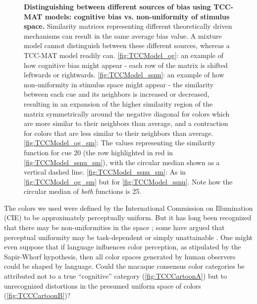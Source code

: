 \begin{figure}
        \caption{\textbf{Distinguishing between different sources of bias using TCC-MAT models: cognitive bias vs. non-uniformity of stimulus space.} Similarity matrices representing different theoretically driven mechanisms can result in the same average bias value. A mixture model cannot distinguish between these different sources, whereas a TCC-MAT model readily can. \ref{fig:TCCModel_og}: an example of how cognitive bias might appear - each row of the matrix is shifted leftwards or rightwards. \ref{fig:TCCModel_ssnu}: an example of how non-uniformity in stimulus space might appear - the similarity between each cue and its neighbors is increased or decreased, resulting in an expansion of the higher similarity region of the matrix symmetrically around the negative diagonal for colors which are more similar to their neighbors than average, and a contraction for colors that are less similar to their neighbors than average. \ref{fig:TCCModel_og_sm}: The values representing the similarity function for cue 20 (the row highlighted in red in \ref{fig:TCCModel_ssnu_sm}), with the circular median shown as a vertical dashed line. \ref{fig:TCCModel_ssnu_sm}: As in \ref{fig:TCCModel_og_sm} but for \ref{fig:TCCModel_ssnu}. Note how the circular median of \emph{both} functions is 25.}
        \label{fig:TCCDemo}
\end{figure}


The colors we used were defined by the International Commission on Illumination (CIE) to be approximately perceptually uniform. 
But it has long been recognized that there may be non-uniformities in the space%
; some have argued that perceptual uniformity may be task-dependent or simply unattainable%
. 
One might even suppose that if language influences color perception, as stipulated by the Sapir-Whorf hypothesis, then all color spaces generated by human observers could be shaped by language. 
Could the macaque consensus color categories be attributed not to a true “cognitive” category (\autoref{fig:TCCCartoonA}) but to unrecognized distortions in the presumed uniform space of colors (\autoref{fig:TCCCartoonB})? 


